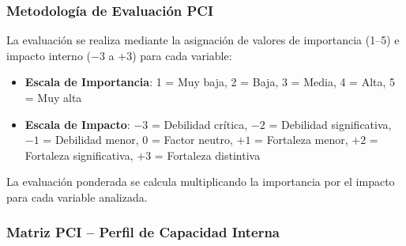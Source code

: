 \subsubsection{Metodología de Evaluación PCI}

La evaluación se realiza mediante la asignación de valores de importancia (1--5) e impacto interno ($-3$ a $+3$) para cada variable:

\begin{itemize}
\item \textbf{Escala de Importancia}: 1 = Muy baja, 2 = Baja, 3 = Media, 4 = Alta, 5 = Muy alta
\item \textbf{Escala de Impacto}: $-3$ = Debilidad crítica, $-2$ = Debilidad significativa, $-1$ = Debilidad menor, 0 = Factor neutro, $+1$ = Fortaleza menor, $+2$ = Fortaleza significativa, $+3$ = Fortaleza distintiva
\end{itemize}

La evaluación ponderada se calcula multiplicando la importancia por el impacto para cada variable analizada.

\subsubsection{Matriz PCI -- Perfil de Capacidad Interna}

